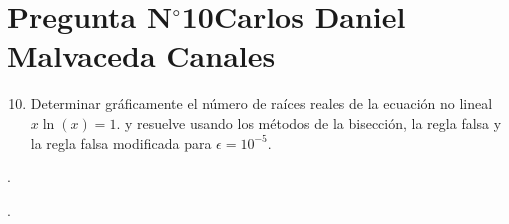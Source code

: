 \section{Pregunta N$^{\circ}$10\qquad Carlos Daniel Malvaceda Canales}

\begin{frame}
	\begin{enumerate}\setcounter{enumi}{9}
		\item

		      Determinar gráficamente el número de raíces reales de la
		      ecuación no lineal
		      \begin{math}
			      x\ln\left(x\right)=
			      1.
		      \end{math}
		      y resuelve usando los métodos de la bisección, la regla
		      falsa y la regla falsa modificada para $\epsilon=10^{-5}$.
	\end{enumerate}

	\begin{solution}

		.
	\end{solution}
\end{frame}

\begin{frame}
	\begin{solution}

		.
	\end{solution}
\end{frame}